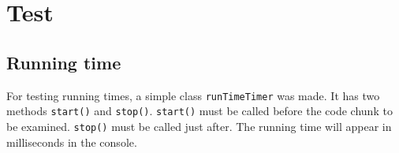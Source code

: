 
\section{Test} \label{sec:test}

\subsection{Running time} \label{sec:test-running-time}

For testing running times, a simple class \texttt{runTimeTimer} was made. It has
two methods \texttt{start()} and \texttt{stop()}. \texttt{start()} must be called
before the code chunk to be examined. \texttt{stop()} must be called just after.
The running time will appear in milliseconds in the console. 

